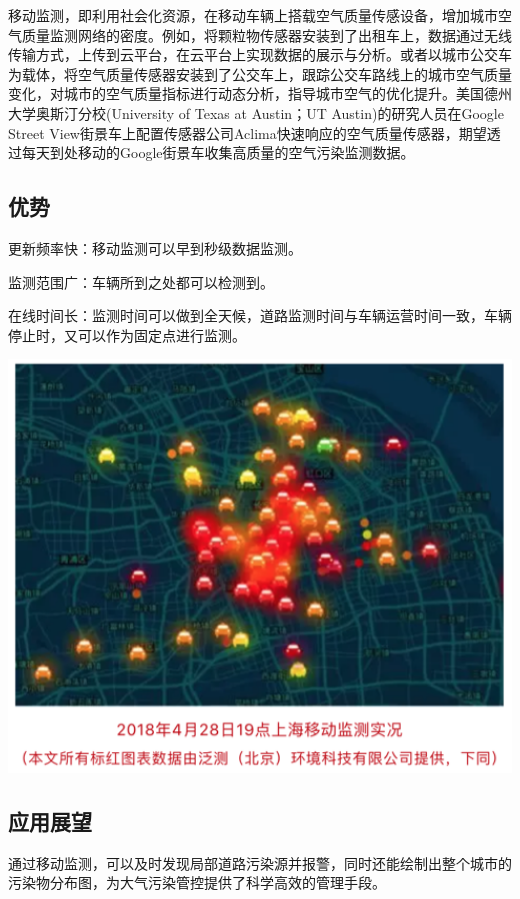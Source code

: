 \documentclass[
]{book}
\begin{document}
移动监测，即利用社会化资源，在移动车辆上搭载空气质量传感设备，增加城市空气质量监测网络的密度。例如，将颗粒物传感器安装到了出租车上，数据通过无线传输方式，上传到云平台，在云平台上实现数据的展示与分析。或者以城市公交车为载体，将空气质量传感器安装到了公交车上，跟踪公交车路线上的城市空气质量变化，对城市的空气质量指标进行动态分析，指导城市空气的优化提升。美国德州大学奥斯汀分校(University of Texas at Austin；UT Austin)的研究人员在Google Street View街景车上配置传感器公司Aclima快速响应的空气质量传感器，期望透过每天到处移动的Google街景车收集高质量的空气污染监测数据。

\hypertarget{ux4f18ux52bf}{%
\subsection{优势}\label{ux4f18ux52bf}}

更新频率快：移动监测可以早到秒级数据监测。

监测范围广：车辆所到之处都可以检测到。

在线时间长：监测时间可以做到全天候，道路监测时间与车辆运营时间一致，车辆停止时，又可以作为固定点进行监测。

\includegraphics[width=6.67in]{images/dlyd2}

\hypertarget{ux5e94ux7528ux5c55ux671b}{%
\subsection{应用展望}\label{ux5e94ux7528ux5c55ux671b}}

通过移动监测，可以及时发现局部道路污染源并报警，同时还能绘制出整个城市的污染物分布图，为大气污染管控提供了科学高效的管理手段。
\end{document}
